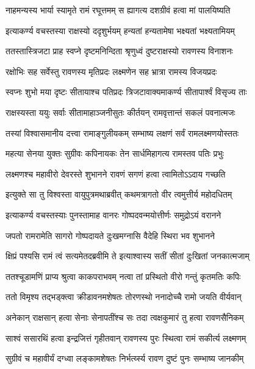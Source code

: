 \twolineshloka
{नाहमन्यस्य भार्या स्यामृते रामं रघूत्तमम्}
{स ह्यागत्य दशग्रीवं हत्वा मां पालयिष्यति} %

\twolineshloka
{इत्याकर्ण्य वचस्तस्या राक्षस्यो ददृशुर्भयम्}
{हन्यतां हन्यतामेषा भक्ष्यतां भक्ष्यतामियम्} %

\twolineshloka
{ततस्तास्त्रिजटा प्राह स्वप्ने दृष्टमनिन्दिता}
{श्रृणुध्वं दुष्टराक्षस्यो रावणस्य विनाशनः} %

\twolineshloka
{रक्षोभिः सह सर्वेस्तु रावणस्य मृतिप्रदः}
{लक्ष्मणेन सह भ्रात्रा रामस्य विजयप्रदः} %

\twolineshloka
{स्वप्नः शुभो मया दृष्टः सीतायाश्च पतिप्रदः}
{त्रिजटावाक्यमाकर्ण्य सीतापार्श्वं विसृज्य ताः} %

\twolineshloka
{राक्षस्यस्ता ययुः सर्वाः सीतामाहाञ्जनीसुतः}
{कीर्तयन् रामवृत्तान्तं सकलं पवनात्मजः} %

\twolineshloka
{तस्यां विश्वासमानीय दत्त्वा रामाङ्गुलीयकम्}
{सम्भाष्य लक्षणं सर्वं रामलक्ष्मणयोस्ततः} %

\twolineshloka
{महत्या सेनया युक्तः सुग्रीवः कपिनायकः}
{तेन सार्धमिहागत्य रामस्तव पतिः प्रभुः} %

\twolineshloka
{लक्ष्मणश्च महावीरो देवरस्ते शुभानने}
{रावणं सगणं हत्वा त्वामितोऽऽदाय गच्छति} %

\twolineshloka
{इत्युक्ते सा तु विश्वस्ता वायुपुत्रमथाब्रवीत्}
{कथमत्रागतो वीर त्वमुत्तीर्य महोदधितम्} %

\twolineshloka
{इत्याकर्ण्य वचस्तस्याः पुनस्तामाह वानरः}
{गोष्पदवन्मयोत्तीर्णः समुद्रोऽयं वरानने} %

\twolineshloka
{जपतो रामरामेति सागरो गोष्पदायते}
{दुःखमग्नासि वैदेहि स्थिरा भव शुभानने} %

\twolineshloka
{क्षिप्रं पश्यसि रामं त्वं सत्यमेतदब्रवीमि ते}
{इत्याश्वास्य सतीं सीतां दुःखितां जनकात्मजाम्} %

\twolineshloka
{ततश्चूडामणिं प्राप्य श्रुत्वा काकपराभवम्}
{नत्वा तां प्रस्थितो वीरो गन्तुं कृतमतिः कपिः} %

\twolineshloka
{ततो विमृश्य तद्भड्क्त्वा क्रीडावनमशेषतः}
{तोरणस्थो ननादोच्चै रामो जयति वीर्यवान्} %

\twolineshloka
{अनेकान् राक्षसान् हत्वा सेनाः सेनापतींश्च सः}
{तदा त्वक्षकुमारं तु हत्वा रावणसैनिकम्} %

\twolineshloka
{साश्वं ससारथिं हत्वा इन्द्रजित्तं गृहीतवान्}
{रावणस्य पुरः स्थित्वा रामं सकीर्त्य लक्ष्मणम्} %

\twolineshloka
{सुग्रीवं च महावीर्यं दग्ध्वा लङ्कामशेषतः}
{निर्भर्त्य्स्य रावण दुष्टं पुनः सम्भाष्य जानकीम्} %

